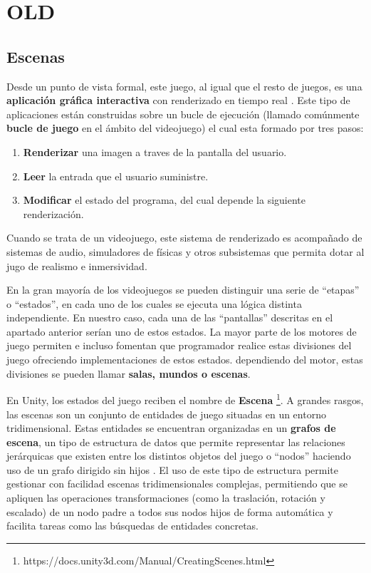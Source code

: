 \section{OLD}
\subsection{Escenas}
Desde un punto de vista formal, este juego, al igual que el resto de juegos, es una \textbf{aplicación gráfica interactiva} con renderizado en tiempo real \cite{libro_esi}. Este tipo de aplicaciones están construidas sobre un bucle de ejecución (llamado comúnmente \textbf{bucle de juego} en el ámbito del videojuego) el cual esta formado por tres pasos:
\begin{enumerate}
\item \textbf{Renderizar} una imagen a traves de la pantalla del usuario.
\item \textbf{Leer} la entrada que el usuario suministre.
\item \textbf{Modificar} el estado del programa, del cual depende la siguiente renderización.
\end{enumerate}
Cuando se trata de un videojuego, este sistema de renderizado es acompañado de sistemas de audio, simuladores de físicas y otros subsistemas que permita dotar al jugo de realismo e inmersividad.

En la gran mayoría de los videojuegos se pueden distinguir una serie de ``etapas'' o ``estados'', en cada uno de los cuales se ejecuta una lógica distinta independiente. En nuestro caso, cada una de las ``pantallas'' descritas en el apartado anterior serían uno de estos estados. La mayor parte de los motores de juego permiten e incluso fomentan que programador realice estas divisiones del juego ofreciendo implementaciones de estos estados. dependiendo del motor, estas divisiones se pueden llamar \textbf{salas, mundos o escenas}.

En Unity, los estados del juego reciben el nombre de \textbf{Escena} \footnote{https://docs.unity3d.com/Manual/CreatingScenes.html}. A grandes rasgos, las escenas son un conjunto de entidades de juego situadas en un entorno tridimensional. Estas entidades se encuentran organizadas en un \textbf{grafos de escena}, un tipo de estructura de datos que permite representar las relaciones jerárquicas que existen entre los distintos objetos del juego o ``nodos'' haciendo uso de un grafo dirigido sin hijos \cite{libro_esi}. El uso de este tipo de estructura permite gestionar con facilidad escenas tridimensionales complejas, permitiendo que se apliquen las operaciones transformaciones (como la traslación, rotación y escalado) de un nodo padre a todos sus nodos hijos de forma automática y facilita tareas como las búsquedas de entidades concretas.

